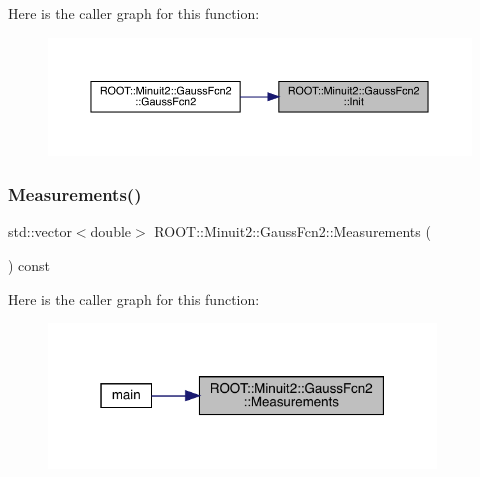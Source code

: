 Here is the caller graph for this function\+:\nopagebreak
\begin{figure}[H]
\begin{center}
\leavevmode
\includegraphics[width=350pt]{da/d5d/classROOT_1_1Minuit2_1_1GaussFcn2_a4094daab77c76f30bacb299c5c3dfba4_icgraph}
\end{center}
\end{figure}
\mbox{\label{classROOT_1_1Minuit2_1_1GaussFcn2_acd862030b2db540b0a7210e78c2f913f}} 
\subsubsection{\texorpdfstring{Measurements()}{Measurements()}}
{\footnotesize\ttfamily std\+::vector$<$double$>$ R\+O\+O\+T\+::\+Minuit2\+::\+Gauss\+Fcn2\+::\+Measurements (\begin{DoxyParamCaption}{ }\end{DoxyParamCaption}) const\hspace{0.3cm}{\ttfamily [inline]}}

Here is the caller graph for this function\+:\nopagebreak
\begin{figure}[H]
\begin{center}
\leavevmode
\includegraphics[width=292pt]{da/d5d/classROOT_1_1Minuit2_1_1GaussFcn2_acd862030b2db540b0a7210e78c2f913f_icgraph}
\end{center}
\end{figure}
\mbox{\label{classROOT_1_1Minuit2_1_1GaussFcn2_ad90e2fe9c9a2392c1e110a3e4679bfc3}} 
